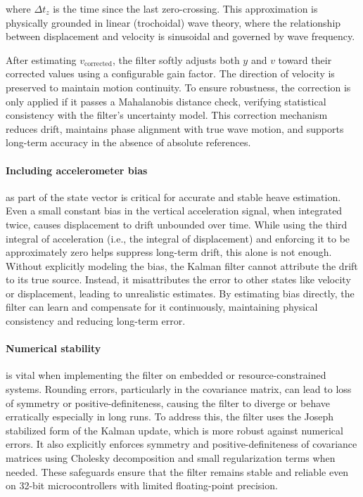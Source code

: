 \documentclass[11pt,letterpaper]{article}
\begin{document}
where \( \Delta t_{z} \) is the time since the last zero-crossing. This approximation is physically grounded in linear (trochoidal) wave theory\cite{Clamond2007,Gerstner1809}, where the relationship between displacement and velocity is sinusoidal and governed by wave frequency.

After estimating \( v_{\text{corrected}} \), the filter softly adjusts both \( y \) and \( v \) toward their corrected values using a configurable gain factor. The direction of velocity is preserved to maintain motion continuity. To ensure robustness, the correction is only applied if it passes a Mahalanobis distance check, verifying statistical consistency with the filter's uncertainty model. This correction mechanism reduces drift, maintains phase alignment with true wave motion, and supports long-term accuracy in the absence of absolute references.

\paragraph{Including accelerometer bias}
as part of the state vector is critical for accurate and stable heave estimation. Even a small constant bias in the vertical acceleration signal, when integrated twice, causes displacement to drift unbounded over time. While using the third integral of acceleration (i.e., the integral of displacement) and enforcing it to be approximately zero helps suppress long-term drift, this alone is not enough. Without explicitly modeling the bias, the Kalman filter cannot attribute the drift to its true source. Instead, it misattributes the error to other states like velocity or displacement, leading to unrealistic estimates. By estimating bias directly, the filter can learn and compensate for it continuously, maintaining physical consistency and reducing long-term error.

\paragraph{Numerical stability}
is vital when implementing the filter on embedded or resource-constrained systems. Rounding errors, particularly in the covariance matrix, can lead to loss of symmetry or positive-definiteness, causing the filter to diverge or behave erratically especially in long runs. To address this, the filter uses the Joseph stabilized form of the Kalman update, which is more robust against numerical errors. It also explicitly enforces symmetry and positive-definiteness of covariance matrices using Cholesky decomposition and small regularization terms when needed. These safeguards ensure that the filter remains stable and reliable even on 32-bit microcontrollers with limited floating-point precision.
\end{document}
